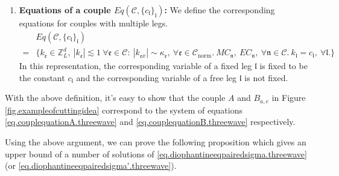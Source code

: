 \begin{defn}
\begin{enumerate}
    
    \item \textbf{Equations of a couple $Eq(\mathcal{C},\{c_{\mathfrak{l}}\}_{\mathfrak{l}})$:} We define the corresponding equations for couples with multiple legs.
    \begin{equation}\label{eq.Eq(C,c).threewave}
    \begin{split}
        &Eq(\mathcal{C},\{c_{\mathfrak{l}}\}_{\mathfrak{l}})
        \\
        =&\{k_{\mathfrak{e}}\in \mathbb{Z}^d_L,\ |k_{\mathfrak{e}}|\lesssim 1\ \forall \mathfrak{e}\in \mathcal{C}:\  |k_{\mathfrak{e}x}| \sim \kappa_{\mathfrak{e}},\ \forall \mathfrak{e}\in \mathcal{C}_{\text{norm}}.\ MC_{\mathfrak{n}},\  EC_{\mathfrak{n}},\ \forall \mathfrak{n}\in \mathcal{C}.\ k_{\mathfrak{l}}=c_{\mathfrak{l}},\ \forall \mathfrak{l}.\}   
    \end{split}
    \end{equation}
    In this representation, the corresponding variable of a fixed leg $\mathfrak{l}$ is fixed to be the constant $c_{\mathfrak{l}}$ and the corresponding variable of a free leg $\mathfrak{l}$ is not fixed.
\end{enumerate}
\end{defn}

With the above definition, it's easy to show that the couple $A$ and $B_{a,e}$ in Figure \ref{fig.exampleofcuttingidea} correspond to the system of equations \eqref{eq.couplequationA.threewave} and \eqref{eq.couplequationB.threewave} respectively.


Using the above argument, we can prove the following proposition which gives an upper bound of a number of solutions of \eqref{eq.diophantineeqpairedsigma.threewave} (or \eqref{eq.diophantineeqpairedsigma'.threewave}).


